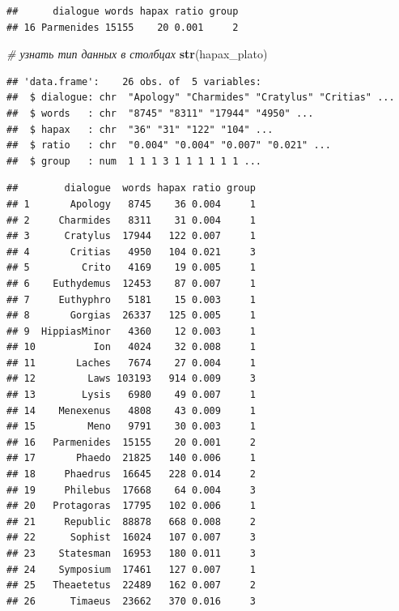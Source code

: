 \documentclass[
]{book}
\newenvironment{Shaded}{\begin{snugshade}}{\end{snugshade}}
\newcommand{\CommentTok}[1]{\textcolor[rgb]{0.56,0.35,0.01}{\textit{#1}}}
\newcommand{\DecValTok}[1]{\textcolor[rgb]{0.00,0.00,0.81}{#1}}
\newcommand{\FunctionTok}[1]{\textcolor[rgb]{0.13,0.29,0.53}{\textbf{#1}}}
\newcommand{\NormalTok}[1]{#1}
\newcommand{\SpecialCharTok}[1]{\textcolor[rgb]{0.81,0.36,0.00}{\textbf{#1}}}
\theoremstyle{definition}
\theoremstyle{definition}
\theoremstyle{definition}
\theoremstyle{definition}
\theoremstyle{remark}
\begin{document}
\begin{verbatim}
##      dialogue words hapax ratio group
## 16 Parmenides 15155    20 0.001     2
\end{verbatim}

\begin{Shaded}
\begin{Highlighting}[]
\CommentTok{\# узнать тип данных в столбцах}
\FunctionTok{str}\NormalTok{(hapax\_plato) }
\end{Highlighting}
\end{Shaded}

\begin{verbatim}
## 'data.frame':    26 obs. of  5 variables:
##  $ dialogue: chr  "Apology" "Charmides" "Cratylus" "Critias" ...
##  $ words   : chr  "8745" "8311" "17944" "4950" ...
##  $ hapax   : chr  "36" "31" "122" "104" ...
##  $ ratio   : chr  "0.004" "0.004" "0.007" "0.021" ...
##  $ group   : num  1 1 1 3 1 1 1 1 1 1 ...
\end{verbatim}

\begin{Shaded}
\end{Shaded}

\begin{verbatim}
##        dialogue  words hapax ratio group
## 1       Apology   8745    36 0.004     1
## 2     Charmides   8311    31 0.004     1
## 3      Cratylus  17944   122 0.007     1
## 4       Critias   4950   104 0.021     3
## 5         Crito   4169    19 0.005     1
## 6    Euthydemus  12453    87 0.007     1
## 7     Euthyphro   5181    15 0.003     1
## 8       Gorgias  26337   125 0.005     1
## 9  HippiasMinor   4360    12 0.003     1
## 10          Ion   4024    32 0.008     1
## 11       Laches   7674    27 0.004     1
## 12         Laws 103193   914 0.009     3
## 13        Lysis   6980    49 0.007     1
## 14    Menexenus   4808    43 0.009     1
## 15         Meno   9791    30 0.003     1
## 16   Parmenides  15155    20 0.001     2
## 17       Phaedo  21825   140 0.006     1
## 18     Phaedrus  16645   228 0.014     2
## 19     Philebus  17668    64 0.004     3
## 20   Protagoras  17795   102 0.006     1
## 21     Republic  88878   668 0.008     2
## 22      Sophist  16024   107 0.007     3
## 23    Statesman  16953   180 0.011     3
## 24    Symposium  17461   127 0.007     1
## 25   Theaetetus  22489   162 0.007     2
## 26      Timaeus  23662   370 0.016     3
\end{verbatim}
\end{document}
